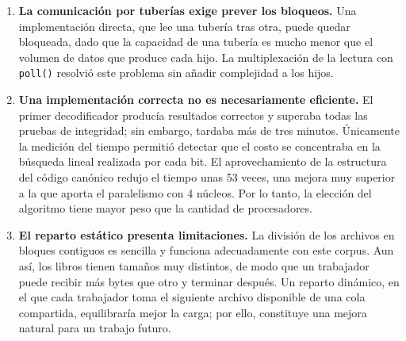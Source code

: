 \documentclass{report}
\begin{document}
\begin{enumerate}
    \item \textbf{La comunicación por tuberías exige prever los bloqueos.} Una implementación directa, que lee una tubería tras otra, puede quedar bloqueada, dado que la capacidad de una tubería es mucho menor que el volumen de datos que produce cada hijo. La multiplexación de la lectura con \texttt{poll()} resolvió este problema sin añadir complejidad a los hijos.

    \item \textbf{Una implementación correcta no es necesariamente eficiente.} El primer decodificador producía resultados correctos y superaba todas las pruebas de integridad; sin embargo, tardaba más de tres minutos. Únicamente la medición del tiempo permitió detectar que el costo se concentraba en la búsqueda lineal realizada por cada bit. El aprovechamiento de la estructura del código canónico redujo el tiempo unas 53 veces, una mejora muy superior a la que aporta el paralelismo con 4 núcleos. Por lo tanto, la elección del algoritmo tiene mayor peso que la cantidad de procesadores.

    \item \textbf{El reparto estático presenta limitaciones.} La división de los archivos en bloques contiguos es sencilla y funciona adecuadamente con este corpus. Aun así, los libros tienen tamaños muy distintos, de modo que un trabajador puede recibir más bytes que otro y terminar después. Un reparto dinámico, en el que cada trabajador toma el siguiente archivo disponible de una cola compartida, equilibraría mejor la carga; por ello, constituye una mejora natural para un trabajo futuro.
\end{enumerate}



%

\end{document}
